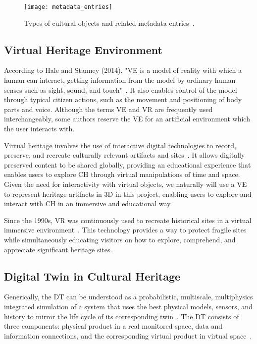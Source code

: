 \begin{figure}[h!]
    \centering
    \texttt{[image: metadata\_entries]}
    \caption{Types of cultural objects and related metadata entries~\cite{Windhager2019Visualization}.}
    \label{fig:ch_objects}
\end{figure}
\FloatBarrier


\subsection{Virtual Heritage Environment}
\label{sec:virtual_heritage}

According to Hale and Stanney (2014), "\gls{VE} is a model of reality with which a human can interact, getting information 
from the model by ordinary human senses such as sight, sound, and touch"~\cite{hale2014handbook}. 
It also enables control of the model through typical citizen actions, such as the movement and positioning of body parts and voice. 
Although the terms \gls{VE} and \gls{VR} are frequently used interchangeably, some authors reserve the \gls{VE} for an artificial environment which the user interacts with.

Virtual heritage involves the use of interactive digital technologies to record, preserve, and recreate 
culturally relevant artifacts and sites~\cite{848434}. It allows digitally preserved content to be shared globally, providing an educational experience that enables users to explore \gls{CH} through virtual manipulations of time and space. 
Given the need for interactivity with virtual objects, we naturally will use a \gls{VE} to represent heritage artifacts 
in \gls{3D} in this project, enabling users to explore and interact with \gls{CH} in an immersive and educational way.

Since the 1990s, \gls{VR} was continuously used to recreate historical sites in a virtual immersive environment~\cite{hale2014handbook}. 
This technology provides a way to protect fragile sites while simultaneously educating visitors on how to explore, comprehend, and appreciate significant heritage sites.

\subsection{Digital Twin in Cultural Heritage}
\label{sec:digital_twin}


Generically, the \gls{DT} can be understood as a probabilistic, multiscale,
multiphysics integrated simulation of a system that uses the best physical models,
sensors, and history to mirror the life cycle of its corresponding twin~\cite{dezen2020towards}.
The \gls{DT} consists of three components: physical product in a real monitored
space, data and information connections, and the corresponding virtual product
in virtual space~\cite{grieves2017digital}.


